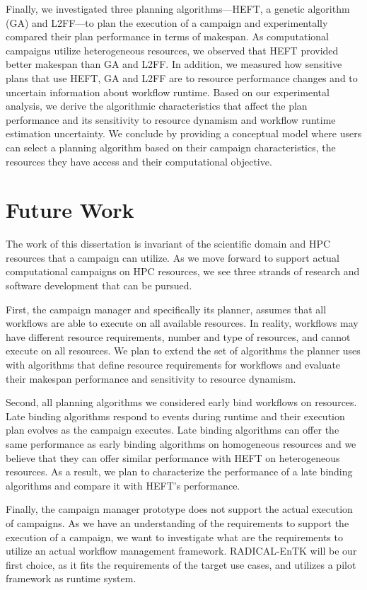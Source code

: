 Finally, we investigated three planning algorithms---HEFT, a genetic algorithm
(GA) and L2FF---to plan the execution of a campaign and experimentally compared
their plan performance in terms of makespan. As computational campaigns utilize
heterogeneous resources, we observed that HEFT provided better makespan than GA
and L2FF. In addition, we measured how sensitive plans that use HEFT, GA and
L2FF are to resource performance changes and to uncertain information about
workflow runtime. Based on our experimental analysis, we derive the algorithmic
characteristics that affect the plan performance and its sensitivity to resource
dynamism and workflow runtime estimation uncertainty. We conclude by providing a
conceptual model where users can select a planning algorithm based on their
campaign characteristics, the resources they have access and their computational
objective.

\section{Future Work}

The work of this dissertation is invariant of the scientific domain and HPC
resources that a campaign can utilize. As we move forward to support actual
computational campaigns on HPC resources, we see three strands of research and
software development that can be pursued.

First, the campaign manager and specifically its planner, assumes that all
workflows are able to execute on all available resources. In reality,
workflows may have different resource requirements, number and type of
resources, and cannot execute on all resources. We plan to extend the set of
algorithms the planner uses with algorithms that define resource requirements
for workflows and evaluate their makespan performance and sensitivity to
resource dynamism.

Second, all planning algorithms we considered early bind workflows on resources.
Late binding algorithms respond to events during runtime and their execution
plan evolves as the campaign executes. Late binding algorithms can offer the
same performance as early binding algorithms on homogeneous resources and we
believe that they can offer similar performance with HEFT on heterogeneous
resources. As a result, we plan to characterize the performance of a late
binding algorithms and compare it with HEFT's performance.

Finally, the campaign manager prototype does not support the actual execution of
campaigns. As we have an understanding of the requirements to support the
execution of a campaign, we want to investigate what are the requirements to
utilize an actual workflow management framework. RADICAL-EnTK will be our
first choice, as it fits the requirements of the target use cases, and utilizes
a pilot framework as runtime system.
